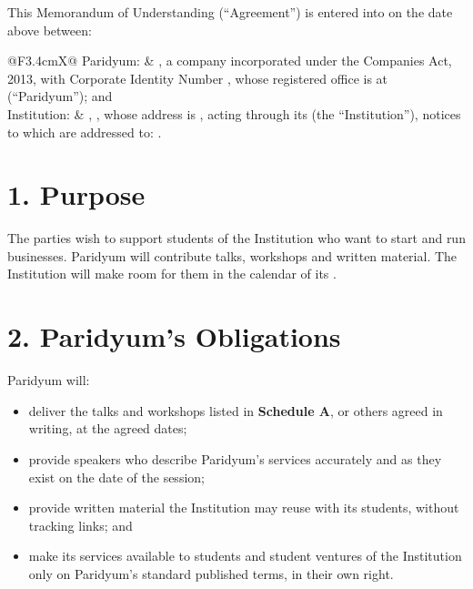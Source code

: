 \documentclass{paridyum}
\begin{document}
\paridyumletterhead
\paridyumdateref{\dkDocDate}{\dkDocRef}
\paridyumverifiable{\dkDocVerify}

This Memorandum of Understanding (``Agreement'') is entered into on the date above between:

\vspace{0.5em}
\begin{tabularx}{\linewidth}{@{}F{3.4cm}X@{}}
Paridyum: & \textbf{\dkOrgName}, a company incorporated under the Companies Act, 2013,
            with Corporate Identity Number \dkOrgCin, whose registered office is at
            \dkOrgRegisteredOffice{} (``Paridyum''); and \\[0.6em]
Institution: & \textbf{\dkCLegalName}, \dkTLegalDescription, whose address is \dkCAddress,
            acting through its \dkTActingThrough{} (the ``Institution''), notices to which are
            addressed to: \dkCOffice.
\end{tabularx}

\section*{1. Purpose}
The parties wish to support students of the Institution who want to start and run businesses.
Paridyum will contribute talks, workshops and written material. The Institution will make room
for them in the calendar of its \dkTActingThrough.

\section*{2. Paridyum's Obligations}
Paridyum will:
\begin{itemize}[leftmargin=*, noitemsep]
    \item deliver the talks and workshops listed in \textbf{Schedule A}, or others agreed in
          writing, at the agreed dates;
    \item provide speakers who describe Paridyum's services accurately and as they exist on the
          date of the session;
    \item provide written material the Institution may reuse with its students, without tracking
          links; and
    \item make its services available to students and student ventures of the Institution only
          on Paridyum's standard published terms, in their own right.
\end{itemize}
\end{document}
